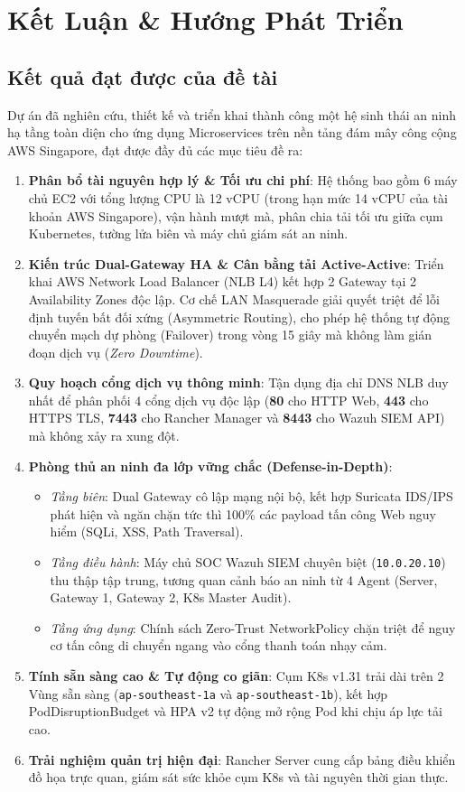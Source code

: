 \chapter{Kết Luận \& Hướng Phát Triển}
\label{ch:conclusion}

\section{Kết quả đạt được của đề tài}
Dự án đã nghiên cứu, thiết kế và triển khai thành công một hệ sinh thái an ninh hạ tầng toàn diện cho ứng dụng Microservices trên nền tảng đám mây công cộng AWS Singapore, đạt được đầy đủ các mục tiêu đề ra:

\begin{enumerate}
    \item \textbf{Phân bổ tài nguyên hợp lý \& Tối ưu chi phí}: Hệ thống bao gồm 6 máy chủ EC2 với tổng lượng CPU là 12 vCPU (trong hạn mức 14 vCPU của tài khoản AWS Singapore), vận hành mượt mà, phân chia tải tối ưu giữa cụm Kubernetes, tường lửa biên và máy chủ giám sát an ninh.
    \item \textbf{Kiến trúc Dual-Gateway HA \& Cân bằng tải Active-Active}: Triển khai AWS Network Load Balancer (NLB L4) kết hợp 2 Gateway tại 2 Availability Zones độc lập. Cơ chế LAN Masquerade giải quyết triệt để lỗi định tuyến bất đối xứng (Asymmetric Routing), cho phép hệ thống tự động chuyển mạch dự phòng (Failover) trong vòng 15 giây mà không làm gián đoạn dịch vụ (\textit{Zero Downtime}).
    \item \textbf{Quy hoạch cổng dịch vụ thông minh}: Tận dụng địa chỉ DNS NLB duy nhất để phân phối 4 cổng dịch vụ độc lập (\textbf{80} cho HTTP Web, \textbf{443} cho HTTPS TLS, \textbf{7443} cho Rancher Manager và \textbf{8443} cho Wazuh SIEM API) mà không xảy ra xung đột.
    \item \textbf{Phòng thủ an ninh đa lớp vững chắc (Defense-in-Depth)}:
    \begin{itemize}
        \item \textit{Tầng biên}: Dual Gateway cô lập mạng nội bộ, kết hợp Suricata IDS/IPS phát hiện và ngăn chặn tức thì 100\% các payload tấn công Web nguy hiểm (SQLi, XSS, Path Traversal).
        \item \textit{Tầng điều hành}: Máy chủ SOC Wazuh SIEM chuyên biệt (\texttt{10.0.20.10}) thu thập tập trung, tương quan cảnh báo an ninh từ 4 Agent (Server, Gateway 1, Gateway 2, K8s Master Audit).
        \item \textit{Tầng ứng dụng}: Chính sách Zero-Trust NetworkPolicy chặn triệt để nguy cơ tấn công di chuyển ngang vào cổng thanh toán nhạy cảm.
    \end{itemize}
    \item \textbf{Tính sẵn sàng cao \& Tự động co giãn}: Cụm K8s v1.31 trải dài trên 2 Vùng sẵn sàng (\texttt{ap-southeast-1a} và \texttt{ap-southeast-1b}), kết hợp PodDisruptionBudget và HPA v2 tự động mở rộng Pod khi chịu áp lực tải cao.
    \item \textbf{Trải nghiệm quản trị hiện đại}: Rancher Server cung cấp bảng điều khiển đồ họa trực quan, giám sát sức khỏe cụm K8s và tài nguyên thời gian thực.
\end{enumerate}

